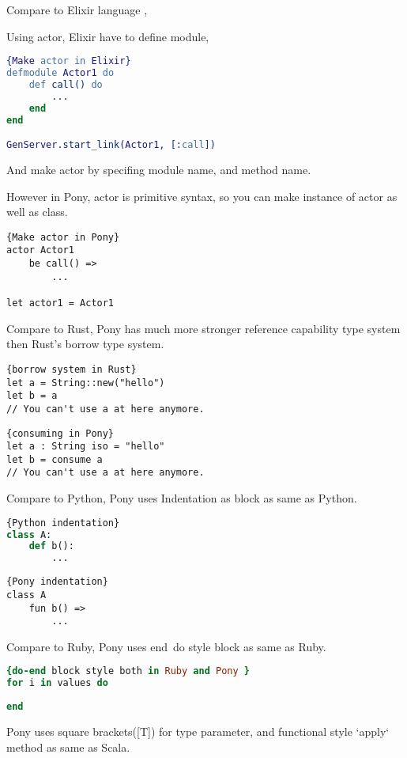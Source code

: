 \documentclass{article}
\begin{document}
Compare to Elixir language \cite{elixir}, 

Using actor, Elixir have to define module,
\begin{lstlisting}[language=Erlang]{Make actor in Elixir}
defmodule Actor1 do
	def call() do
		...
	end	
end	

GenServer.start_link(Actor1, [:call])
\end{lstlisting}
And make actor by specifing module name, and method name.

However in Pony, actor is primitive syntax, so you can make instance of actor as well as class.
\begin{lstlisting}{Make actor in Pony}
actor Actor1
	be call() =>
		...
		
let actor1 = Actor1		
\end{lstlisting}

Compare to Rust, Pony has much more stronger reference capability type system then Rust's borrow type system.

\begin{lstlisting}{borrow system in Rust}
let a = String::new("hello")
let b = a
// You can't use a at here anymore.
\end{lstlisting}

\begin{lstlisting}{consuming in Pony}
let a : String iso = "hello"
let b = consume a
// You can't use a at here anymore.
\end{lstlisting}


Compare to Python, Pony uses Indentation as block as same as Python.


\begin{lstlisting}[language=Python]{Python indentation}
class A:
	def b():
		...
\end{lstlisting}

\begin{lstlisting}{Pony indentation}
class A
	fun b() =>
		...
\end{lstlisting}

Compare to Ruby, Pony uses end~do style block as same as Ruby.

\begin{lstlisting}[language=Ruby]{do-end block style both in Ruby and Pony }
for i in values do
	
end		
\end{lstlisting}

Pony uses square brackets([T]) for type parameter, and functional style `apply` method as same as Scala.
\end{document}
